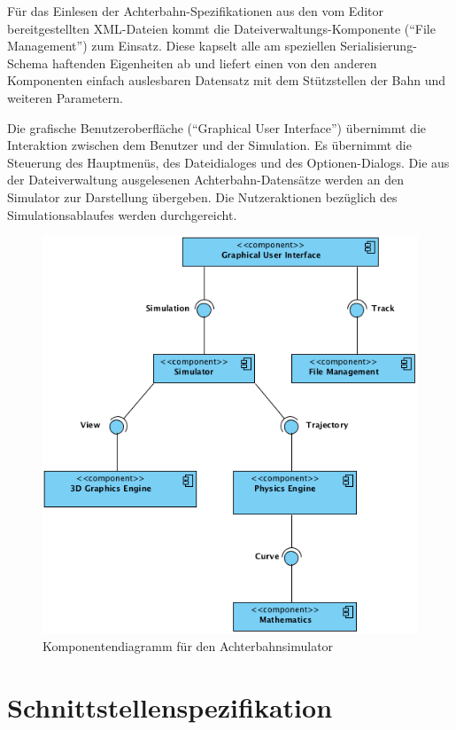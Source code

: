 Für das Einlesen der Achterbahn-Spezifikationen aus den vom Editor bereitgestellten
XML-Dateien kommt die Dateiverwaltungs-Komponente (``File Management'') zum Einsatz. Diese kapselt alle
am speziellen Serialisierung-Schema haftenden Eigenheiten ab und liefert einen
von den anderen Komponenten einfach auslesbaren Datensatz mit dem Stützstellen der
Bahn und weiteren Parametern.

Die grafische Benutzeroberfläche (``Graphical User Interface'') übernimmt die Interaktion zwischen dem Benutzer und
der Simulation. Es übernimmt die Steuerung des Hauptmenüs, des Dateidialoges und
des Optionen-Dialogs. Die aus der Dateiverwaltung ausgelesenen Achterbahn-Datensätze 
werden an den Simulator zur Darstellung übergeben. Die Nutzeraktionen bezüglich des
Simulationsablaufes werden durchgereicht.

\begin{figure}
\includegraphics[width=16cm]{bilder/component_overview}
\caption{Komponentendiagramm für den Achterbahnsimulator}
\label{labelname}
\end{figure}

\section{Schnittstellenspezifikation}

